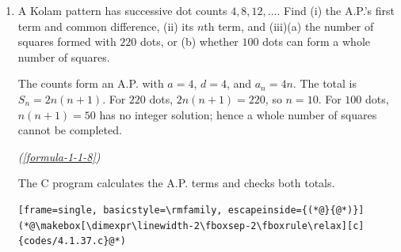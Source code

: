 \vspace{0.8em}
\begin{enumerate}[label={},leftmargin=1.15cm,labelwidth=1.0cm,labelsep=0.15cm,itemindent=0pt,listparindent=0pt,parsep=0pt,topsep=0pt]
\item[4.1.37] A Kolam pattern has successive dot counts $4,8,12,\ldots$. Find (i) the A.P.'s first term and common difference, (ii) its $n$th term, and (iii)(a) the number of squares formed with $220$ dots, or (b) whether $100$ dots can form a whole number of squares.

\vspace{0.7em}\par\solution


The counts form an A.P. with $a=4$, $d=4$, and $a_n=4n$. The total is $S_n=2n(n+1)$. For $220$ dots, $2n(n+1)=220$, so $n=10$. For $100$ dots, $n(n+1)=50$ has no integer solution; hence a whole number of squares cannot be completed.\par\noindent\hfill\mbox{\textit{(\ref{formula-1-1-8})}}\par

The C program calculates the A.P. terms and checks both totals.
\begin{lstlisting}[frame=single, basicstyle=\rmfamily, escapeinside={(*@}{@*)}]
(*@\makebox[\dimexpr\linewidth-2\fboxsep-2\fboxrule\relax][c]{codes/4.1.37.c}@*)
\end{lstlisting}
\end{enumerate}

